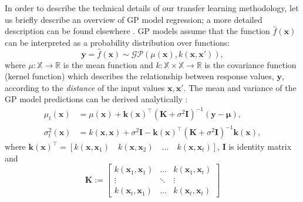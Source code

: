 In order to describe the technical details of our transfer learning methodology, let us briefly describe an overview of GP model regression; a more detailed description can be found elsewhere \cite{gpml}. GP models assume that the function $\hat{f}(\mathbf{x})$ can be interpreted as a probability distribution over functions:
\begin{equation} \label{eq:gp}
\mathbf{y}=\hat{f}(\mathbf{x}) \sim \mathcal{GP} (\mu(\mathbf{x}), k(\mathbf{x}, \mathbf{x}')),
\end{equation}
where $\mu:\mathbb{X}\rightarrow\mathbb{R}$ is the mean function and $k:\mathbb{X}\times\mathbb{X}\rightarrow\mathbb{R}$ is the covariance function (kernel function) which describes the relationship between response values, $\mathbf{y}$, according to the \emph{distance} of the input values $\mathbf{x},\mathbf{x}'$.
The mean and variance of the GP model predictions can be derived analytically \cite{gpml}:
\begin{align}
\mu_{t}(\mathbf{x})&=\mu(\mathbf{x})+\mathbf{k}(\mathbf{x})^\intercal (\mathbf{K}+\sigma^2\mathbf{I})^{-1} (\mathbf{y}-\boldsymbol{\mu}), \label{eq:gp-surrogate-mean}\\
\sigma_t^2(\mathbf{x})&=k(\mathbf{x},\mathbf{x})+\sigma^2\mathbf{I} - \mathbf{k}(\mathbf{x})^\intercal (\mathbf{K}+\sigma^2\mathbf{I})^{-1} \mathbf{k}(\mathbf{x}), \label{eq:gp-surrogate-sigma}
\end{align}
where $\mathbf{k}(\mathbf{x})^\intercal=[k(\mathbf{x},\mathbf{x}_1) \quad k(\mathbf{x},\mathbf{x}_2) \quad \dots \quad k(\mathbf{x},\mathbf{x}_t)]$, $\mathbf{I}$ is identity matrix and
\begin{equation} \label{eq:covariance}
\mathbf{K}:=
\begin{bmatrix}
k(\mathbf{x}_1,\mathbf{x}_1)  &  \dots & k(\mathbf{x}_1,\mathbf{x}_t)   \\
\vdots  & \ddots &  \vdots \\
k(\mathbf{x}_t,\mathbf{x}_1)  &  \dots & k(\mathbf{x}_t,\mathbf{x}_t)
\end{bmatrix}
\end{equation}


